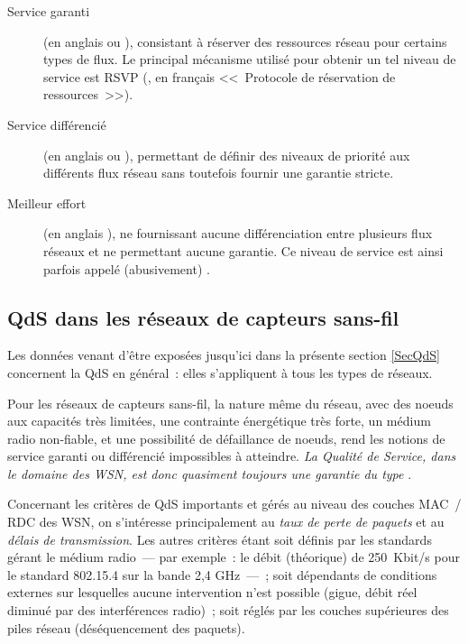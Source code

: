 \begin{description}

\item[Service garanti] (en anglais  ou 
), consistant à réserver des ressources réseau pour certains
types de flux. Le principal mécanisme utilisé pour obtenir un tel niveau
de service est RSVP (, en français
<<~Protocole de réservation de ressources~>>).

\item[Service différencié] (en anglais  ou
), permettant de définir des niveaux de priorité aux
différents flux réseau sans toutefois fournir une garantie stricte.

\item[Meilleur effort] (en anglais ), ne fournissant
aucune différenciation entre plusieurs flux réseaux et ne permettant
aucune garantie. Ce niveau de service est ainsi parfois appelé
(abusivement) .

\end{description}


\subsection{QdS dans les réseaux de capteurs sans-fil}
\label{SubsecQdsWSN}

Les données venant d'être exposées jusqu'ici dans la présente section
\ref{SecQdS} concernent la QdS en général~: elles s'appliquent à tous
les types de réseaux.

Pour les réseaux de capteurs sans-fil, la nature même du réseau, avec
des noeuds aux capacités très limitées, une contrainte énergétique
très forte, un médium radio non-fiable, et une possibilité de défaillance
de noeuds, rend les notions de service garanti ou différencié impossibles
à atteindre. \emph{La Qualité de Service, dans le domaine des WSN,
est donc quasiment toujours une garantie du type }.

Concernant les critères de QdS importants et gérés au niveau des
couches MAC~/ RDC des WSN, on s'intéresse principalement au
\emph{taux de perte de paquets} et au \emph{délais de transmission}.
Les autres critères étant soit définis par les standards gérant
le médium radio~--- par exemple~: le débit (théorique) de 250~Kbit/s
pour le standard 802.15.4 sur la bande 2,4 GHz~---~; soit dépendants
de conditions externes sur lesquelles aucune intervention n'est possible
(gigue, débit réel diminué par des interférences radio)~; soit réglés
par les couches supérieures des piles réseau (déséquencement des paquets).

